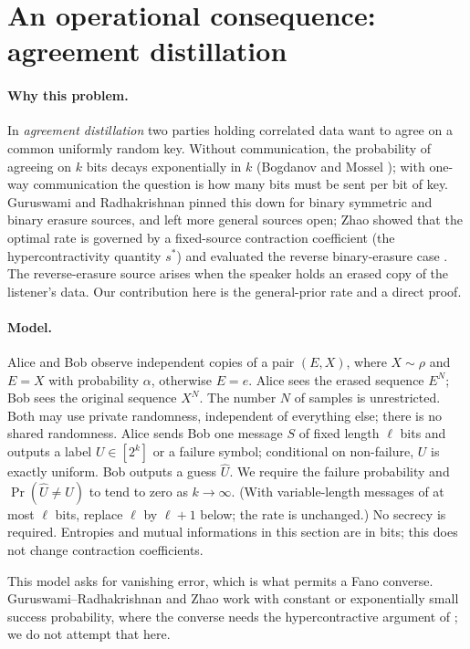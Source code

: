\documentclass[11pt,a4paper]{article}
\numberwithin{equation}{section}
\theoremstyle{definition}
\theoremstyle{remark}
\begin{document}


\section{An operational consequence: agreement distillation}\label{sec:agreement}

\paragraph{Why this problem.} In \emph{agreement distillation} two parties
holding correlated data want to agree on a common uniformly random key.
Without communication, the probability of agreeing on \(k\) bits decays
exponentially in \(k\) (Bogdanov and Mossel \cite{bogdanov}); with one-way communication the question is how many
bits must be sent per bit of key. Guruswami and Radhakrishnan
\cite{guruswami} pinned this down for binary symmetric and binary erasure
sources, and left more general sources open; Zhao \cite[Chapter~3]{zhao}
showed that the optimal rate is governed by a fixed-source contraction
coefficient (the hypercontractivity quantity \(s^*\)) and evaluated the
reverse binary-erasure case \cite[Corollary~3.1.3]{zhao}. The
reverse-erasure source arises when the speaker holds an erased copy of the
listener's data. Our contribution here is the general-prior rate and a
direct proof.

\paragraph{Model.} Alice and Bob observe independent copies of a pair
\((E,X)\), where \(X\sim\rho\) and \(E=X\) with probability \(\alpha\),
otherwise \(E=e\). Alice sees the erased sequence \(E^N\); Bob sees the
original sequence \(X^N\). The number \(N\) of samples is unrestricted. Both
may use private randomness, independent of everything else; there is no
shared randomness. Alice sends Bob one message \(S\) of fixed length
\(\ell\) bits and outputs a label \(U\in[2^k]\) or a failure symbol;
conditional on non-failure, \(U\) is exactly uniform. Bob outputs a guess
\(\hat U\). We require the failure probability and \(\Pr(\hat U\ne U)\) to
tend to zero as \(k\to\infty\). (With variable-length messages of at most
\(\ell\) bits, replace \(\ell\) by \(\ell+1\) below; the rate is unchanged.)
No secrecy is required. Entropies and mutual informations in this section
are in bits; this does not change contraction coefficients.

This model asks for vanishing error, which is what permits a Fano converse.
Guruswami--Radhakrishnan and Zhao work with constant or exponentially small
success probability,
where the converse needs the hypercontractive argument of
\cite[Theorem~3.1.1]{zhao}; we do not attempt that here.
\end{document}
